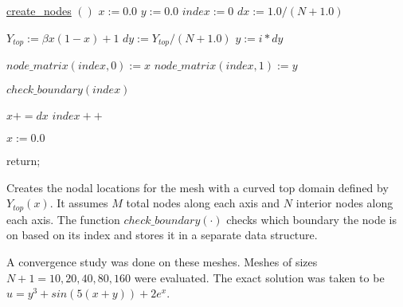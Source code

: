 \documentclass[a4paper, 12pt]{article}
\begin{document}
\begin{algorithm}[H]
  \underline{create\_nodes} $()$
  \BlankLine
  $x := 0.0$ \;
  $y := 0.0$ \;
  $index := 0$ \;
  $dx := 1.0 / (N+1.0)$\;
  {
    {
      $Y_{top} := \beta x (1-x) + 1$\;
      $dy := Y_{top} / (N+1.0)$\;
      $y := i * dy$\;

      $node\_matrix( index, 0) := x$\;
      $node\_matrix( index, 1) := y$\;

      $check\_boundary( index)$\;

      $x += dx$\;
      $index++$\;
    }
    $x := 0.0$\;
  }
  return;
  \caption{Creates the nodal locations for the mesh with 
           a curved top domain defined by $Y_{top}(x)$. 
           It assumes $M$ total nodes along each axis 
           and $N$ interior nodes along each axis.
           The function $check\_boundary(\cdot)$ checks
           which boundary the node is on based on its index
           and stores it in a separate data structure.}
  \label{al:create_nodes}
\end{algorithm}
\vspace{\baselineskip}


A convergence study was done on these meshes. 
Meshes of sizes $N+1=10, 20, 40, 80, 160$ were evaluated.
The exact solution was taken to be 
$u = y^3 + sin( 5 (x + y)) + 2e^x$.

\end{document}
